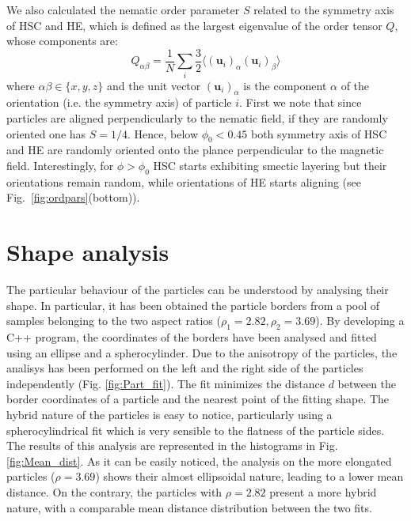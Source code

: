 \documentclass{article}
\begin{document}
We also calculated the nematic order parameter $S$ related to the symmetry axis of HSC and HE, which
is defined as the largest eigenvalue of the order tensor $Q$, whose components are:
\begin{equation}
Q_{\alpha\beta} = \frac{1}{N} \sum_i \frac{3}{2} \langle (\mathbf{u}_i)_\alpha (\mathbf{u}_i)_\beta\rangle
\label{eq:nemop}
\end{equation}
where $\alpha\beta\in\{x,y,z\}$ and the unit vector $(\mathbf{u}_i)_\alpha$ is the component $\alpha$ of the orientation (i.e. the symmetry axis) of particle $i$.
First we note that since particles are aligned perpendicularly to the nematic field, if they are 
randomly oriented one has $S=1/4$. Hence, below $\phi_0 < 0.45$ both symmetry axis of HSC and HE are 
randomly oriented onto the plance perpendicular to the magnetic field.
Interestingly, for $\phi > \phi_0$ HSC starts exhibiting smectic layering but their orientations
remain random, while orientations of HE starts aligning (see Fig.~\ref{fig:ordpars}(bottom)).

\section{Shape analysis}

The particular behaviour of the particles can be understood by analysing their shape. In particular, it has been obtained the particle borders from a pool of samples belonging to the two aspect ratios ($\rho_1 = 2.82, \rho_2 = 3.69$). By developing a C++ program, the coordinates of the borders have been analysed and fitted using an ellipse and a spherocylinder. Due to the anisotropy of the particles, the analisys has been performed on the left and the right side of the particles independently (Fig. \ref{fig:Part_fit}). The fit minimizes the distance $d$ between the border coordinates of a particle and the nearest point of the fitting shape. The hybrid nature of the particles is easy to notice, particularly using a spherocylindrical fit which is very sensible to the flatness of the particle sides. The results of this analysis are represented in the histograms in Fig. \ref{fig:Mean_dist}. As it can be easily noticed, the analysis on the more elongated particles ($\rho = 3.69$) shows their almost ellipsoidal nature, leading to a lower mean distance. On the contrary, the particles with $\rho = 2.82$ present a more hybrid nature, with a comparable mean distance distribution between the two fits.
\end{document}
